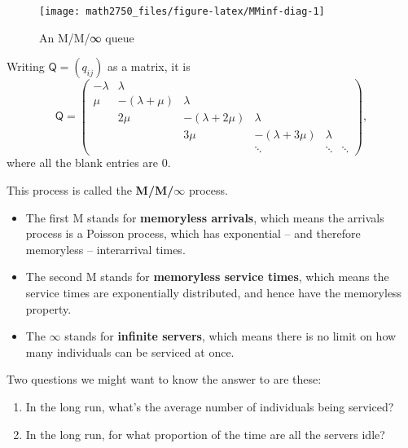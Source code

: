 \documentclass[
  a4paper,
]{article}
\providecommand{\tightlist}{%
  \setlength{\itemsep}{0pt}\setlength{\parskip}{0pt}}
\theoremstyle{definition}
\theoremstyle{definition}
\theoremstyle{definition}
\theoremstyle{remark}
\begin{document}
\begin{figure}

{\centering \texttt{[image: math2750\_files/figure-latex/MMinf-diag-1]} 

}

\caption{An M/M/∞ queue}\label{fig:MMinf-diag}
\end{figure}

Writing \(\mathsf Q = (q_{ij})\) as a matrix, it is
\[ \mathsf Q = \begin{pmatrix}
-\lambda & \lambda          &                   &                   &         &        \\
\mu      & -(\lambda + \mu) & \lambda           &                   &         &        \\
         & 2\mu             & -(\lambda + 2\mu) & \lambda           &         &        \\
         &                  & 3\mu              & -(\lambda + 3\mu) & \lambda &        \\
         &                  &                   & \ddots            & \ddots  & \ddots
\end{pmatrix} , \]
where all the blank entries are 0.

This process is called the \textbf{M/M/\(\infty\)} process.

\begin{itemize}
\tightlist
\item
  The first M stands for \textbf{memoryless arrivals}, which means the arrivals process is a Poisson process, which has exponential -- and therefore memoryless -- interarrival times.
\item
  The second M stands for \textbf{memoryless service times}, which means the service times are exponentially distributed, and hence have the memoryless property.
\item
  The \(\infty\) stands for \textbf{infinite servers}, which means there is no limit on how many individuals can be serviced at once.
\end{itemize}

Two questions we might want to know the answer to are these:

\begin{enumerate}
\def\labelenumi{\arabic{enumi}.}
\tightlist
\item
  In the long run, what's the average number of individuals being serviced?
\item
  In the long run, for what proportion of the time are all the servers idle?
\end{enumerate}
\end{document}
